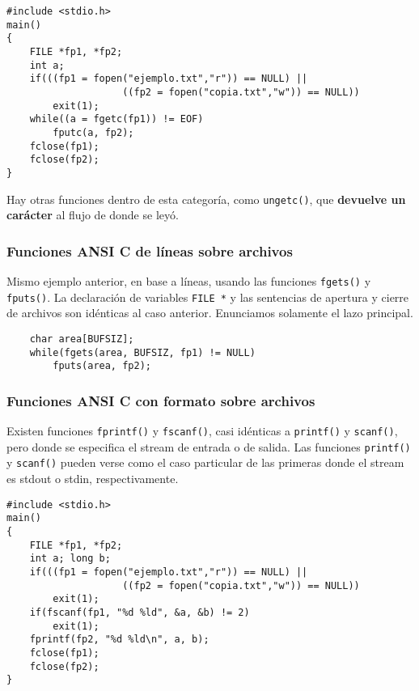 \begin{lstlisting}
#include <stdio.h>
main()
{
    FILE *fp1, *fp2;
    int a;
    if(((fp1 = fopen("ejemplo.txt","r")) == NULL) ||
                    ((fp2 = fopen("copia.txt","w")) == NULL))
        exit(1);
    while((a = fgetc(fp1)) != EOF)
        fputc(a, fp2);
    fclose(fp1);
    fclose(fp2);
}
\end{lstlisting}

Hay otras funciones dentro de esta categoría, como \lstinline{ungetc()}, que \textbf{devuelve un
carácter} al flujo de donde se leyó.

\subsubsection{Funciones ANSI C de líneas sobre archivos}
\label{subsubsec:esarchivosansiclineas}
Mismo ejemplo anterior, en base a líneas, usando las funciones \lstinline{fgets()} y \lstinline{fputs()}. La
declaración de variables \lstinline{FILE *} y las sentencias de apertura y cierre de
archivos son idénticas al caso anterior. Enunciamos solamente el lazo
principal.
    
\begin{lstlisting}
    char area[BUFSIZ];
    while(fgets(area, BUFSIZ, fp1) != NULL)
        fputs(area, fp2);
\end{lstlisting}

\subsubsection{Funciones ANSI C con formato sobre archivos}
\label{subsubsec:esarchivosansicformato}

Existen funciones \lstinline{fprintf()} y \lstinline{fscanf()}, casi idénticas a \lstinline{printf()} y \lstinline{scanf()},
pero donde se especifica el stream de entrada o de salida. Las funciones \lstinline{printf()} y \lstinline{scanf()} pueden verse como el caso particular de las primeras donde el
stream es stdout o stdin, respectivamente.

\begin{ejemplo}
\begin{lstlisting}
#include <stdio.h>
main()
{
    FILE *fp1, *fp2;
    int a; long b;
    if(((fp1 = fopen("ejemplo.txt","r")) == NULL) ||
                    ((fp2 = fopen("copia.txt","w")) == NULL))
        exit(1);
    if(fscanf(fp1, "%d %ld", &a, &b) != 2)
        exit(1);
    fprintf(fp2, "%d %ld\n", a, b);
    fclose(fp1);
    fclose(fp2);
}
\end{lstlisting}
\end{ejemplo}

